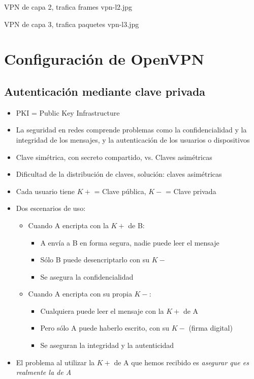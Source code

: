  {VPN de capa 2, trafica frames} {vpn-l2.jpg}

 {VPN de capa 3, trafica paquetes} {vpn-l3.jpg}

\section{Configuración de OpenVPN}

\subsection{Autenticación mediante clave privada}
\begin{itemize}
	\item PKI = Public Key Infrastructure
	\item La seguridad en redes comprende problemas como la confidencialidad y la integridad de los mensajes, y la autenticación de los usuarios o dispositivos
	\item Clave simétrica, con secreto compartido, vs. Claves asimétricas
	\item Dificultad de la distribución de claves, solución: claves asimétricas
	\item Cada usuario tiene $K+$ = Clave pública, $K-$ = Clave privada
	\item Dos escenarios de uso:
	\begin{itemize}
	\item Cuando A encripta con la $K+$ de B:
	\begin{itemize}
		\item A envía a B en forma segura, nadie puede leer el mensaje
		\item Sólo B puede desencriptarlo con su $K-$
		\item Se asegura la confidencialidad
	\end{itemize}
	\item Cuando A encripta con su propia $K-$:
	\begin{itemize}
		\item Cualquiera puede leer el mensaje con la $K+$ de A
		\item Pero sólo A puede haberlo escrito, con su $K-$ (firma digital)
		\item Se aseguran la integridad y la autenticidad
	\end{itemize} 
	\end{itemize}
	\item El problema al utilizar la $K+$ de A que hemos recibido es \emph{asegurar que es realmente la de A}

\end{itemize}

